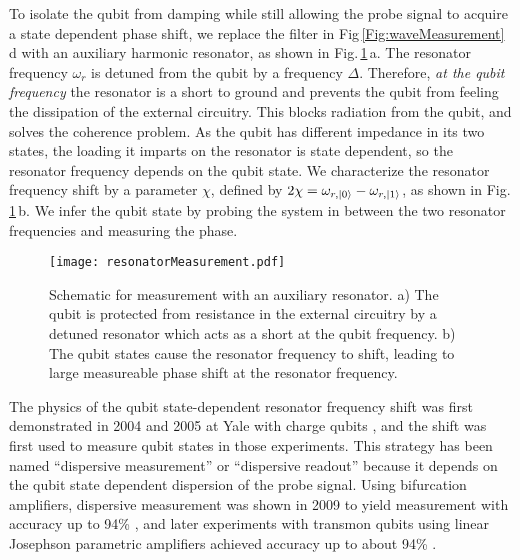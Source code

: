 To isolate the qubit from damping while still allowing the probe signal to acquire a state dependent phase shift, we replace the filter in Fig\,\ref{Fig:waveMeasurement}\,d with an auxiliary harmonic resonator, as shown in Fig.\,\ref{Fig:resonatorMeasurement}\,a.
The resonator frequency $\omega_r$ is detuned from the qubit by a frequency $\Delta$.
Therefore, \emph{at the qubit frequency} the resonator is a short to ground and prevents the qubit from feeling the dissipation of the external circuitry.
This blocks radiation from the qubit, and solves the coherence problem.
As the qubit has different impedance in its two states, the loading it imparts on the resonator is state dependent, so the resonator frequency depends on the qubit state.
We characterize the resonator frequency shift by a parameter $\chi$, defined by $2 \chi = \omega_{r,|0\rangle} - \omega_{r,|1\rangle}$, as shown in Fig.\,\ref{Fig:resonatorMeasurement}\,b.
We infer the qubit state by probing the system in between the two resonator frequencies and measuring the phase.

\begin{figure}
\begin{centering}
\texttt{[image: resonatorMeasurement.pdf]} 
\par\end{centering}
\caption{Schematic for measurement with an auxiliary resonator. a) The qubit is protected from resistance in the external circuitry by a detuned resonator which acts as a short at the qubit frequency. b) The qubit states cause the resonator frequency to shift, leading to large measureable phase shift at the resonator frequency.}
\label{Fig:resonatorMeasurement}
\end{figure}

The physics of the qubit state-dependent resonator frequency shift was first demonstrated in 2004 and 2005 at Yale with charge qubits \cite{Schuster:acStarkDephasing2005, Wallraff:2004, Wallraff:unitVisibility2005}, and the shift was first used to measure qubit states in those experiments.
This strategy has been named ``dispersive measurement'' or ``dispersive readout'' because it depends on the qubit state dependent dispersion of the probe signal.
Using bifurcation amplifiers, dispersive measurement was shown in 2009 to yield measurement with accuracy up to 94\% \cite{Mallet:singleShot2009}, and later experiments with transmon qubits using linear Josephson parametric amplifiers achieved accuracy up to about 94\% \cite{Johnson:heralding2012}.

